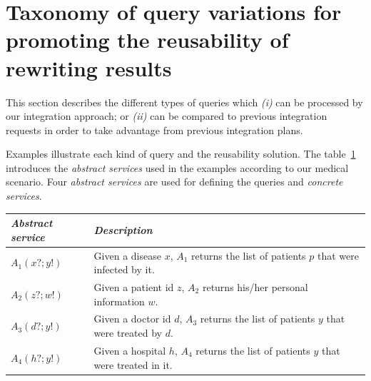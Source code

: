 \section{Taxonomy of query variations for promoting the reusability of rewriting results}

This section describes the different types of queries which \textit{(i)} can be processed by our integration approach; or \textit{(ii)} can be compared to previous integration requests in order to take advantage from previous integration plans.

Examples illustrate each kind of query and the reusability solution. 
The table~\ref{table:abstractservices} introduces the \textsl{abstract services} used in the examples according to our medical scenario. Four \textsl{abstract services} are used for defining the queries and \textsl{concrete services}.



\begin{table}[!ht]
\center
\begin{tabular}{|>{\raggedright\arraybackslash}p{4cm}|>{\raggedright\arraybackslash}p{8cm}|}
\hline 
\textsl{\textbf{Abstract service}} & \textit{\textbf{Description}} \\ 
\hline 
$A_{1} (x?; y!)$ & Given a disease $x$, $A_{1}$ returns the list of patients $p$ that were infected by it. \\ 
\hline 
$A_{2} (z?; w!)$ & Given a patient id $z$, $A_{2}$ returns his/her personal information $w$. \\ 
\hline 
$A_{3} (d?; y!)$ & Given a doctor id $d$, $A_{3}$ returns the list of patients $y$ that were treated by $d$. \\ 
\hline 
$A_{4} (h?; y!)$ & Given a hospital $h$, $A_{4}$ returns the list of patients $y$ that were treated in it. \\ 
\hline  
\end{tabular}\label{table:abstractservices}
\end{table}

